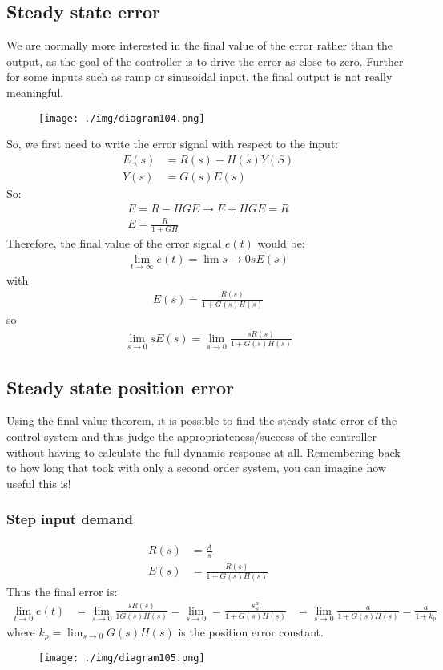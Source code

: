 \subsection{Steady state error}
We are normally more interested in the final value of the error rather than the output, as the goal of the controller is to drive the error as close to zero. Further for some inputs such as ramp or sinusoidal input, the final output is not really meaningful.
\begin{figure}[H]
  \centerline{\texttt{[image: ./img/diagram104.png]}}
  \caption{}
\end{figure}
So, we first need to write the error signal with respect to the input:
\begin{align}
  E(s) & = R(s) - H(s)Y(S) \\
  Y(s) & = G(s)E(s)
\end{align}
So:
\begin{gather}
  E = R - HGE \rightarrow E + HGE = R\\
  E = \frac{R}{1+GH}
\end{gather}
Therefore, the final value of the error signal $e(t)$ would be:
\begin{align}
  \lim_{t\rightarrow \infty} e(t) = \lim{s\rightarrow 0} sE(s)
\end{align}
with
\begin{align}
  E(s) = \frac{R(s)}{1 + G(s) H(s)}
\end{align}
so
\begin{align}
  \lim_{s\rightarrow 0} s E(s) = \lim_{s\rightarrow 0} \frac{sR(s)}{1 + G(s) H(s)}
\end{align}
\subsection{Steady state position error}
Using the final value theorem, it is possible to find the steady state error of the control system and thus judge the appropriateness/success of the controller without having to calculate the full dynamic response at all. Remembering back to how long that took with only a second order system, you can imagine how useful this is!
\subsubsection{Step input demand}
\begin{align}
  R(s) & = \frac{A}{s}               \\
  E(s) & = \frac{R(s)}{1 + G(s)H(s)}
\end{align}
Thus the final error is:
\begin{align}
  \lim_{t\rightarrow 0} e(t) & = \lim_{s\rightarrow 0} \frac{sR(s)}{1 G(s) H(s)} = \lim_{s\rightarrow 0} = \frac{s\frac{a}{s}}{1 + G(s)H(s)}
                             & = \lim_{s\rightarrow 0} \frac{a}{1 +G(s)H(s)} = \frac{a}{1+k_p}
\end{align}
where $k_p = \lim_{s\rightarrow 0} G(s) H(s)$ is the position error constant.
\begin{figure}[H]
  \centerline{\texttt{[image: ./img/diagram105.png]}}
  \caption{}
\end{figure}
